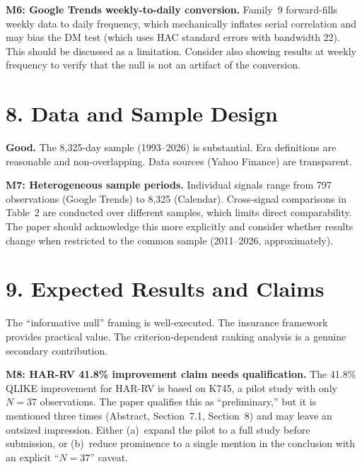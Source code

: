 \documentclass[12pt,a4paper]{article}
\begin{document}
\textcolor{warncolor}{\textbf{M6: Google Trends weekly-to-daily conversion.}}
Family~9 forward-fills weekly data to daily frequency, which mechanically inflates serial correlation and may bias the DM test (which uses HAC standard errors with bandwidth 22). This should be discussed as a limitation. Consider also showing results at weekly frequency to verify that the null is not an artifact of the conversion.

\section*{8. Data and Sample Design}

\textcolor{okgreen}{\textbf{Good.}} The 8,325-day sample (1993--2026) is substantial. Era definitions are reasonable and non-overlapping. Data sources (Yahoo Finance) are transparent.

\textcolor{warncolor}{\textbf{M7: Heterogeneous sample periods.}}
Individual signals range from 797 observations (Google Trends) to 8,325 (Calendar). Cross-signal comparisons in Table~2 are conducted over different samples, which limits direct comparability. The paper should acknowledge this more explicitly and consider whether results change when restricted to the common sample (2011--2026, approximately).

\section*{9. Expected Results and Claims}

The ``informative null'' framing is well-executed. The insurance framework provides practical value. The criterion-dependent ranking analysis is a genuine secondary contribution.

\textcolor{warncolor}{\textbf{M8: HAR-RV 41.8\% improvement claim needs qualification.}}
The 41.8\% QLIKE improvement for HAR-RV is based on K745, a pilot study with only $N=37$ observations. The paper qualifies this as ``preliminary,'' but it is mentioned three times (Abstract, Section~7.1, Section~8) and may leave an outsized impression. Either (a)~expand the pilot to a full study before submission, or (b)~reduce prominence to a single mention in the conclusion with an explicit ``$N=37$'' caveat.
\end{document}
